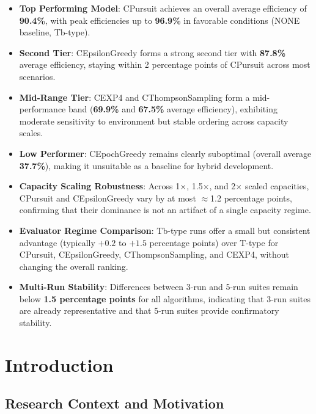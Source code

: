 \documentclass[12pt,a4paper]{article}
\newcommand{\performance}[1]{\textcolor{performancecolor}{\textbf{#1}}}
\newcommand{\critical}[1]{\textcolor{criticalcolor}{\textbf{#1}}}
\newcommand{\success}[1]{\textcolor{successcolor}{\textbf{#1}}}
\begin{document}
\begin{tcolorbox}[colback=highlightcolor!30,colframe=performancecolor,title=\textbf{Key Experimental Results Summary (3-run/5-run, 1$\times$–2$\times$ Capacities, T/Tb Regimes)}]
\begin{itemize}
\item \performance{Top Performing Model}: CPursuit achieves an overall average efficiency of \textbf{90.4\%}, with peak efficiencies up to \textbf{96.9\%} in favorable conditions (NONE baseline, Tb-type).
\item \performance{Second Tier}: CEpsilonGreedy forms a strong second tier with \textbf{87.8\%} average efficiency, staying within 2 percentage points of CPursuit across most scenarios.
\item \performance{Mid-Range Tier}: CEXP4 and CThompsonSampling form a mid-performance band (\textbf{69.9\%} and \textbf{67.5\%} average efficiency), exhibiting moderate sensitivity to environment but stable ordering across capacity scales.
\item \critical{Low Performer}: CEpochGreedy remains clearly suboptimal (overall average \textbf{37.7\%}), making it unsuitable as a baseline for hybrid development.
\item \success{Capacity Scaling Robustness}: Across 1$\times$, 1.5$\times$, and 2$\times$ scaled capacities, CPursuit and CEpsilonGreedy vary by at most $\approx$1.2 percentage points, confirming that their dominance is not an artifact of a single capacity regime.
\item \success{Evaluator Regime Comparison}: Tb-type runs offer a small but consistent advantage (typically $+0.2$ to $+1.5$ percentage points) over T-type for CPursuit, CEpsilonGreedy, CThompsonSampling, and CEXP4, without changing the overall ranking.
\item \success{Multi-Run Stability}: Differences between 3-run and 5-run suites remain below \textbf{1.5 percentage points} for all algorithms, indicating that 3-run suites are already representative and that 5-run suites provide confirmatory stability.
\end{itemize}
\end{tcolorbox}

\newpage
\section{Introduction}

\subsection{Research Context and Motivation}
\end{document}

